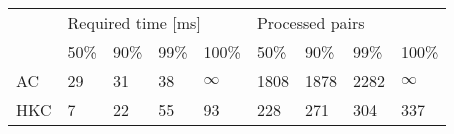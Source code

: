 \begin{tabular}{l|llll|llll}
\multirow{2}{*}{} & \multicolumn{4}{l|}{Required time {[}ms{]}} & \multicolumn{4}{l}{Processed pairs} \\ \cline{2-9}
                  & 50\% & 90\%  & 99\% & 100\%                 & 50\%   & 90\%   & 99\%  & 100\%     \\ \hline
AC                & 29   & 31    & 38   & $\infty$              & 1808   & 1878   & 2282  & $\infty$  \\
HKC               & 7    & 22    & 55   & 93                    & 228    & 271    & 304   & 337       \\
\end{tabular}
